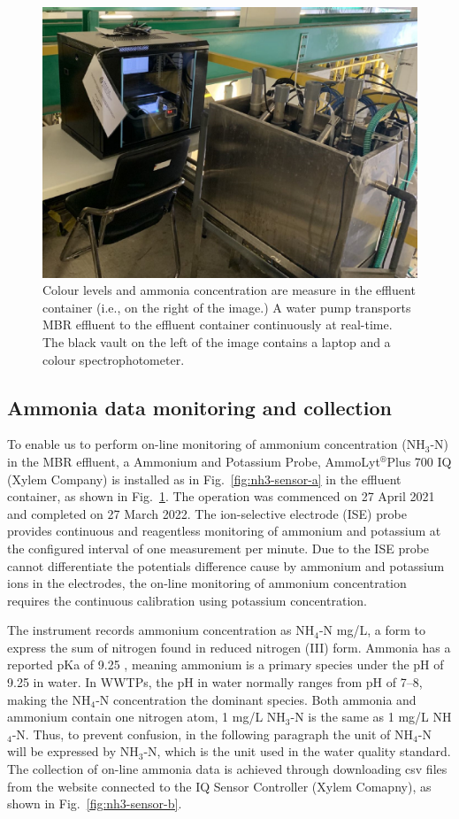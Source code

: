\begin{figure}[h]
    \centering
    \includegraphics[width=0.8\columnwidth]{imgs/instrument/sampling-tank.png}
    \caption{Colour levels and ammonia concentration are measure in the effluent container (i.e., on the right of the image.) A water pump transports MBR effluent to the effluent container continuously at real-time. The black vault on the left of the image contains a laptop and a colour spectrophotometer.} 
    \label{fig:sampling-tank}
 \end{figure}

\subsection{Ammonia data monitoring and collection}
To enable us to perform on-line monitoring of ammonium concentration (NH$_{3}$-N) in the MBR effluent, a Ammonium and Potassium Probe, AmmoLyt$^\circledR$Plus 700 IQ (Xylem Company) is installed as in Fig.~\ref{fig:nh3-sensor-a} in the effluent container, as shown in Fig.~\ref{fig:sampling-tank}. The operation was commenced on 27 April 2021 and completed on 27 March 2022. The ion-selective electrode (ISE) probe provides continuous and reagentless monitoring of ammonium and potassium at the configured interval of one measurement per minute. Due to the ISE probe cannot differentiate the potentials difference cause by ammonium and potassium ions in the electrodes, the on-line monitoring of ammonium concentration requires the continuous calibration using potassium concentration.

The instrument records ammonium concentration as NH$_{4}$-N mg/L, a form to express the sum of nitrogen found in reduced nitrogen (III) form. Ammonia has a reported pKa of 9.25 \citep{nationalcenterforbiotechnologyinformationPubChemCompoundSummary2022}, meaning ammonium is a primary species under the pH of 9.25 in water. In WWTPs, the pH in water normally ranges from pH of 7--8, making the NH$_{4}$-N concentration the dominant species. Both ammonia and ammonium contain one nitrogen atom, 1 mg/L NH$_{3}$-N is the same as 1 mg/L NH$_{4}$-N. Thus, to prevent confusion, in the following paragraph the unit of NH$_{4}$-N will be expressed by NH$_{3}$-N, which is the unit used in the water quality standard. The collection of on-line ammonia data is achieved through downloading csv files from the website connected to the IQ Sensor Controller (Xylem Comapny), as shown in Fig.~\ref{fig:nh3-sensor-b}. 

